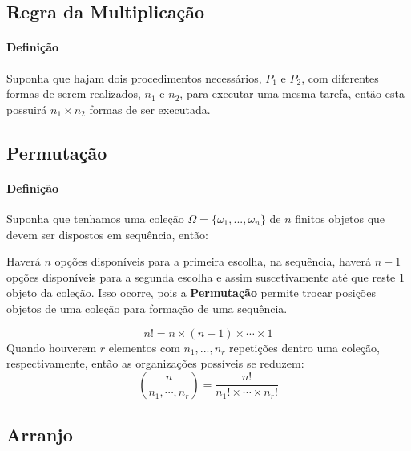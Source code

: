 \documentclass{article}
\begin{document}
        \subsection{Regra da Multiplicação}
            \paragraph{Definição}Suponha que hajam dois procedimentos necessários, $P_{1}$ e $P_{2}$, com diferentes formas de serem realizados, $n_{1}$ e $n_{2}$, para executar uma mesma tarefa, então esta possuirá $n_{1} \times n_{2}$ formas de ser executada.

        \subsection{Permutação}
            \paragraph{Definição}Suponha que tenhamos uma coleção $\Omega = \{ \omega_{1}, ..., \omega_{n} \}$ de $n$ finitos objetos que devem ser dispostos em sequência, então:
                \begin{displayquote}[][]
                    Haverá $n$ opções disponíveis para a primeira escolha, na sequência, haverá $n-1$ opções disponíveis para a segunda escolha e assim suscetivamente até que reste 1 objeto da coleção. Isso ocorre, pois a \textbf{Permutação} permite trocar posições objetos de uma coleção para formação de uma sequência.
                \end{displayquote}
                \begin{equation}
                    \boxed{
                        n! = n \times (n - 1) \times \cdots \times 1
                    }
                \end{equation}
            Quando houverem $r$ elementos com $n_{1}, ..., n_{r}$ repetições dentro uma coleção, respectivamente, então as organizações possíveis se reduzem:
                \begin{equation}
                    \boxed{
                        \binom{n}{n_{1}, \cdots, n_{r}} = \frac{n!}{n_{1}! \times \cdots \times n_{r}!}
                    }
                \end{equation}

        \subsection{Arranjo}
\end{document}
